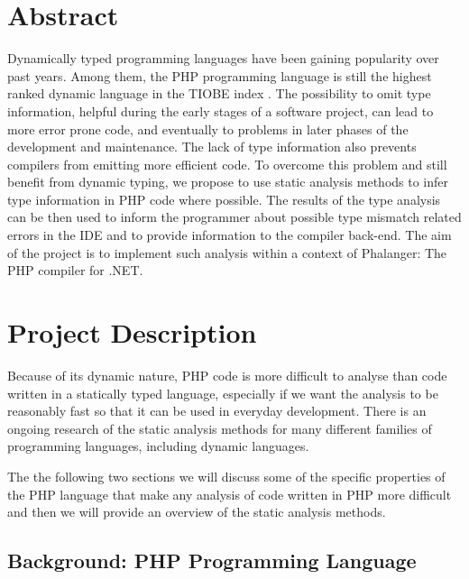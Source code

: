 

\chapter{Abstract}
Dynamically typed programming languages have been gaining popularity 
over past years. Among them, the PHP programming language is still 
the highest ranked dynamic language in the TIOBE index \cite{tiobe}. 
The possibility to omit type information, 
helpful during the early stages of a software project, 
can lead to more error prone code, and eventually to 
problems in later phases of the development and maintenance. 
The lack of type information also prevents compilers 
from emitting more efficient code. To overcome this problem and 
still benefit from dynamic typing, we propose to use static 
analysis methods to infer type information in PHP code where possible. 
The results of the type analysis can be then used to inform 
the programmer about possible type mismatch related errors in 
the IDE and to provide information to the compiler back-end. 
The aim of the project is to implement such analysis 
within a context of Phalanger: The PHP compiler for .NET.


\chapter{Project Description}

Because of its dynamic nature, PHP code is more difficult to analyse 
than code written in a statically typed language, especially if we 
want the analysis to be reasonably fast so that it can be used 
in everyday development. There is an ongoing research of the 
static analysis methods for many different families of programming 
languages, including dynamic languages. 

The the following two sections we will discuss some of the specific 
properties of the PHP language that make any analysis of code 
written in PHP more difficult and then we will provide an overview 
of the static analysis methods.

\section{Background: PHP Programming \mbox{Language}}

